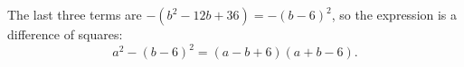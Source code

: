 The last three terms are $-(b^2-12b+36)=-(b-6)^2$, so the expression is a difference of squares:
\[
a^2-(b-6)^2=\boxed{(a-b+6)(a+b-6)}.
\]
